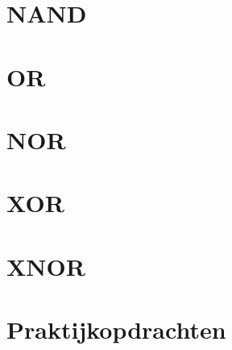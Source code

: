 \documentclass[a4paper,12pt,twoside,openright,titlepage]{book}
\begin{document}
\chapter{NAND}






\chapter{OR}






\chapter{NOR}






\chapter{XOR}






\chapter{XNOR}






\chapter{Praktijkopdrachten}


\backmatter
\printindex
\end{document}
